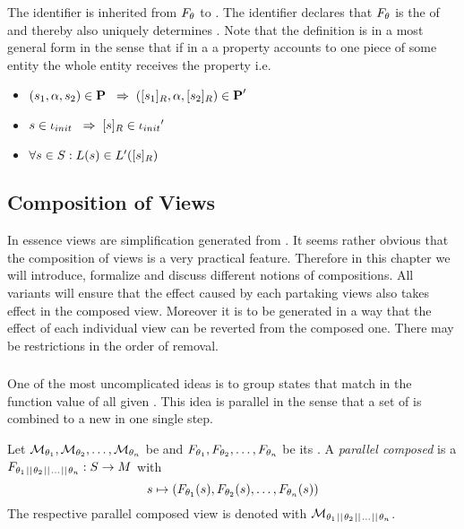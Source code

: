 \documentclass[preview]{standalone}
\begin{document}
The identifier \viewppty is inherited from $\grpfct$ to \view. The identifier declares that $\grpfct$ is the \grpfctN of \view and thereby also uniquely determines \view. Note that the definition is in a most general form in the sense that if in a \viewN a property accounts to one piece of some entity the whole entity receives the property i.e. 
\begin{itemize}	
	\item $(\state_1, \action, \state_2) \in \trans \impr (\eqclassv[\state_1], \action, \eqclassv[\state_2]) \in \trans'$
	\item $\state \in \init \impr \eqclassv \in \initdistrib'$
	\item $\forall \state \in \states : \labelingfct(\state) \in \labelingfct'(\eqclassv)$
\end{itemize}



\subsection{Composition of Views}
In essence views are simplification generated from \chgphN. It seems rather obvious that the composition of views is a very practical feature. Therefore in this chapter we will introduce, formalize and discuss different notions of compositions. All variants will ensure that the effect caused by each partaking views also takes effect in the composed view. Moreover it is to be generated in a way that the effect of each individual view can be reverted from the composed one. There may be restrictions in the order of removal.

\subsubsection{\parllcompNCC}
One of the most uncomplicated ideas is to group states that match in the function value of all given \grpfctsN. This idea is parallel in the sense that a set of \grpfctN is combined to a new \grpfctN in one single step.
\begin{definition}
	Let $\view[\viewppty_1], \view[\viewppty_2], \dots, \view[\viewppty_n]$ be \viewsN and  $\grpfct[\viewppty_1], \grpfct[\viewppty_2], \dots, \grpfct[\viewppty_n]$ be its \grpfctsN. A \emph{parallel composed \grpfctN} is a \grpfctN $\grpfct[{\viewppty_1 \pll \viewppty_2 \pll \dots \pll \viewppty_n}]: \states \to \arbset$ with
	\[
	\state \mapsto (\grpfct[\viewppty_1](\state), \grpfct[\viewppty_2](\state), \dots, \grpfct[\viewppty_n](\state))
	\] 
	The respective parallel composed view is denoted with $\view[\viewppty_1 \pll \viewppty_2 \pll \dots \pll 
	\viewppty_n]$.
		
\end{definition}
\end{document}
